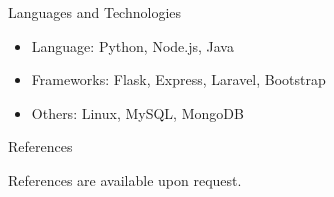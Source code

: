 \documentclass[]{mcdowellcv}
\begin{document}
	
		
		
	\newpage
	\begin{cvsection}{Languages and Technologies}
		\begin{cvsubsection}{}{}{}	
			\begin{itemize}
				\item Language: Python, Node.js, Java
				\item Frameworks: Flask, Express, Laravel, Bootstrap
				\item Others: Linux, MySQL, MongoDB
			\end{itemize}
		\end{cvsubsection}
	\end{cvsection}
	
	\begin{cvsection}{References}
		\begin{cvsubsection}{}{}{}	
			References are available upon request.
		\end{cvsubsection}
	\end{cvsection}
	
	
	
	
	
\end{document}
